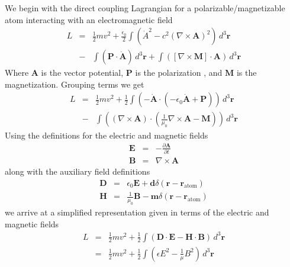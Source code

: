 We begin with the direct coupling Lagrangian for a polarizable/magnetizable atom interacting with an electromagnetic field \cite{thirunamachandran}
\begin{eqnarray}
L&=&\frac{1}{2}mv^2+\frac{\epsilon_0}{2}\int\left(\dot{A}^2-c^2\left(\nabla\times \mathbf{A}\right)^2\right)\,d^3\mathbf{r} \nonumber \\
 &-&\int\left(\mathbf{P}\cdot\dot{\mathbf{A}}\right)\,d^3\mathbf{r}+\int\left( \left[\nabla\times\mathbf{M}\right]\cdot\mathbf{A}\right)\,d^3\mathbf{r}
\end{eqnarray}
Where $\mathbf{A}$ is the vector potential, $\mathbf{P}$ is the polarization , and $\mathbf{M}$ is the magnetization.  
Grouping terms we get
\begin{eqnarray}
L&=&\frac{1}{2}mv^2+\frac{1}{2}\int\left(-\dot{\mathbf{A}}\cdot\left(-\epsilon_0\dot{\mathbf{A}}+\mathbf{P}\right)\right)\,d^3\mathbf{r} \nonumber \\
&-&\int\left( \left(\nabla\times \mathbf{A}\right)\cdot\left(\frac{1}{\mu_0}\nabla\times \mathbf{A}-\mathbf{M}\right)\right)\,d^3\mathbf{r} 
\end{eqnarray}
Using the definitions for the electric and magnetic fields
\begin{eqnarray}
\mathbf{E}&=&-\frac{\partial \mathbf{A}}{\partial t} \\
\mathbf{B}&=&\nabla\times\mathbf{A}
\end{eqnarray}
along with the auxiliary field definitions
\begin{eqnarray}
\mathbf{D}&=&\epsilon_0\mathbf{E}+\mathbf{d}\delta\left(\mathbf{r}-\mathbf{r}_{\mathrm{atom}}\right) \\
\mathbf{H}&=&\frac{1}{\mu_0}\mathbf{B}-\mathbf{m}\delta\left(\mathbf{r}-\mathbf{r}_{\mathrm{atom}}\right)
\end{eqnarray}
we arrive at a simplified representation given in terms of the electric and magnetic fields
\begin{eqnarray}
L&=&\frac{1}{2}mv^2 + \frac{1}{2}\int\left(\mathbf{D}\cdot\mathbf{E}-\mathbf{H}\cdot\mathbf{B}\right)\,d^3\mathbf{r} \nonumber \\
&=&\frac{1}{2}mv^2 + \frac{1}{2}\int\left(\epsilon E^2-\frac{1}{\mu}B^2\right)\,d^3\mathbf{r} 
\label{lagrangian1}
\end{eqnarray}

